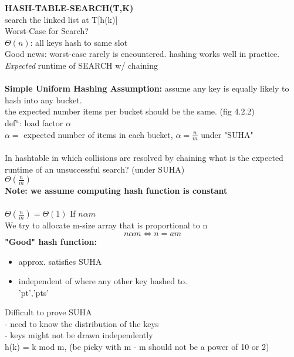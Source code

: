 \documentclass{article}
\begin{document}
	\textbf{HASH-TABLE-SEARCH(T,K)}\\
	search the linked list at T[h(k)]\\
	Worst-Case for Search?\\
	$\Theta(n)$: all keys hash to same slot\\
	Good news: worst-case rarely is encountered. hashing works well in practice.\\
	\emph{Expected }runtime of SEARCH w/ chaining\\\\
	\textbf{Simple Uniform Hashing Assumption: } assume any key is equally likely to hash into any bucket.\\
	the expected number items per bucket should be the same. (fig 4.2.2)\\
	def$^n$: load factor $\alpha$\\
	$\alpha = $ expected number of items in each bucket, $\alpha = \frac{n}{m}$ under "SUHA"\\\\
	In hashtable in which collisions are resolved by chaining what is the expected runtime of an unsuccessful search? (under SUHA)\\
	$\Theta(\frac{n}{m})$\\
	\textbf{Note: we assume computing hash function is constant}\\\\
	$\Theta(\frac{n}{m}) = \Theta(1)$ If $n\alpha m$\\
	We try to allocate m-size array that is proportional to n
	$$n\alpha m \iff n=am$$
	\textbf{"Good" hash function: }
	\begin{itemize}
		\item approx. satisfies SUHA
		\item independent of where any other key hashed to.\\ 'pt','pts'\\
	\end{itemize}
	Difficult to prove SUHA\\
	- need to know the distribution of the keys\\
	- keys might not be drawn independently\\
	h(k) = k mod m, (be picky with m - m should not be a power of 10 or 2)\\\\
	
\end{document}
